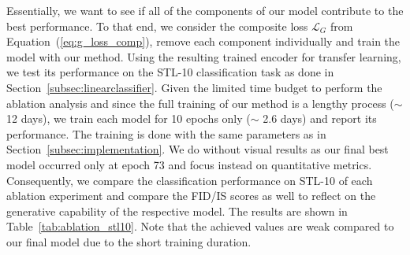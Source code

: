 \documentclass[a4paper,12pt]{report}
\begin{document}
Essentially, we want to see if all of the components of our model contribute to the best performance. To that end, we consider the composite loss $\mathcal{L}_{G}$ from Equation~(\ref{eq:g_loss_comp}), remove each component individually and train the model with our method. Using the resulting trained encoder for transfer learning, we test its performance on the STL-10 classification task as done in Section~\ref{subsec:linearclassifier}. Given the limited time budget to perform the ablation analysis and since the full training of our method is a lengthy process ($\sim$ 12 days), we train each model for 10 epochs only ($\sim$ 2.6 days) and report its performance. The training is done with the same parameters as in Section~\ref{subsec:implementation}. We do without visual results as our final best model occurred only at epoch 73 and focus instead on quantitative metrics. Consequently, we compare the classification performance on STL-10 of each ablation experiment and compare the FID/IS scores as well to reflect on the generative capability of the respective model. The results are shown in Table~\ref{tab:ablation_stl10}. Note that the achieved values are weak compared to our final model due to the short training duration.
\end{document}
